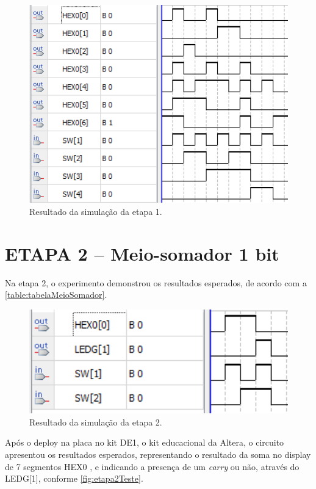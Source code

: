		\begin{figure}[H]
		    \centering
			\caption{\label{fig:etapa1Simulacao}Resultado da simulação da etapa 1.}
			\includegraphics[width=1\textwidth]{img/etapa1/SimulacaoSegmentos7}
		\end{figure}


	\section{ETAPA 2 – Meio-somador 1 bit}
		Na etapa 2, o experimento demonstrou os resultados esperados, de acordo com a
		 \autoref{table:tabelaMeioSomador}.

		\begin{figure}[H]
		    \centering
			\caption{\label{fig:etapa2Simulacao}Resultado da simulação da etapa 2.}
			\includegraphics[width=1\textwidth]{img/etapa2/SimulacaoMeioSomador1Bit}
		\end{figure}

		Após o deploy na placa no kit DE1, o kit educacional da Altera, o circuito apresentou
		 os resultados esperados, representando o resultado da soma no display de 7 segmentos HEX0 ,
		e indicando a presença de um \textit{carry} ou não, através do LEDG[1],
		 conforme \autoref{fig:etapa2Teste}.

